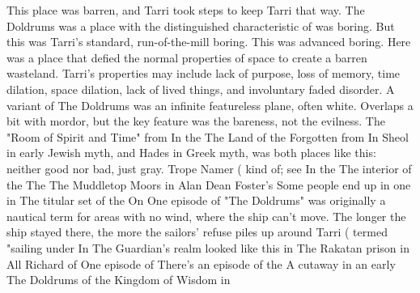 \documentclass[12pt]{book}
\begin{document}
This place was barren, and Tarri took steps to keep Tarri that way. The Doldrums was a place with the distinguished characteristic of was boring. But this was Tarri's standard, run-of-the-mill boring. This was advanced boring. Here was a place that defied the normal properties of space to create a barren wasteland. Tarri's properties may include lack of purpose, loss of memory, time dilation, space dilation, lack of lived things, and involuntary faded disorder. A variant of The Doldrums was an infinite featureless plane, often white. Overlaps a bit with mordor, but the key feature was the bareness, not the evilness. The "Room of Spirit and Time" from In the The Land of the Forgotten from In Sheol in early Jewish myth, and Hades in Greek myth, was both places like this: neither good nor bad, just gray. Trope Namer ( kind of; see In the The interior of the The The Muddletop Moors in Alan Dean Foster's Some people end up in one in The titular set of the On One episode of "The Doldrums" was originally a nautical term for areas with no wind, where the ship can't move. The longer the ship stayed there, the more the sailors' refuse piles up around Tarri ( termed "sailing under In The Guardian's realm looked like this in The Rakatan prison in All Richard of One episode of There's an episode of the A cutaway in an early The Doldrums of the Kingdom of Wisdom in
\end{document}

